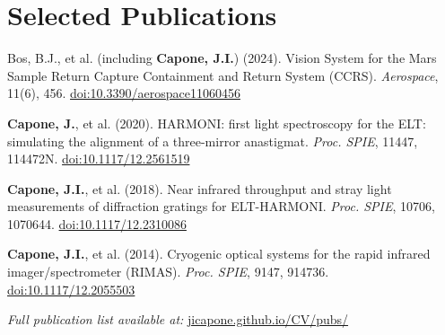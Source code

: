 \documentclass[letterpaper,11pt]{article}
\begin{document}
\section{Selected Publications}
\begin{itemize}[leftmargin=0.15in, label={}, noitemsep, topsep=0pt]
    \small{
        \item{Bos, B.J., et al. (including \textbf{Capone, J.I.}) (2024). Vision System for the Mars Sample Return Capture Containment and Return System (CCRS). \textit{Aerospace}, 11(6), 456. \href{https://doi.org/10.3390/aerospace11060456}{doi:10.3390/aerospace11060456}}
        \item{\textbf{Capone, J.}, et al. (2020). HARMONI: first light spectroscopy for the ELT: simulating the alignment of a three-mirror anastigmat. \textit{Proc. SPIE}, 11447, 114472N. \href{https://doi.org/10.1117/12.2561519}{doi:10.1117/12.2561519}}
        \item{\textbf{Capone, J.I.}, et al. (2018). Near infrared throughput and stray light measurements of diffraction gratings for ELT-HARMONI. \textit{Proc. SPIE}, 10706, 1070644. \href{https://doi.org/10.1117/12.2310086}{doi:10.1117/12.2310086}}
        \item{\textbf{Capone, J.I.}, et al. (2014). Cryogenic optical systems for the rapid infrared imager/spectrometer (RIMAS). \textit{Proc. SPIE}, 9147, 914736. \href{https://doi.org/10.1117/12.2055503}{doi:10.1117/12.2055503}}
        \item{\textit{Full publication list available at:} \href{https://jicapone.github.io/CV/pubs/}{jicapone.github.io/CV/pubs/}}
    }
\end{itemize}
\end{document}
